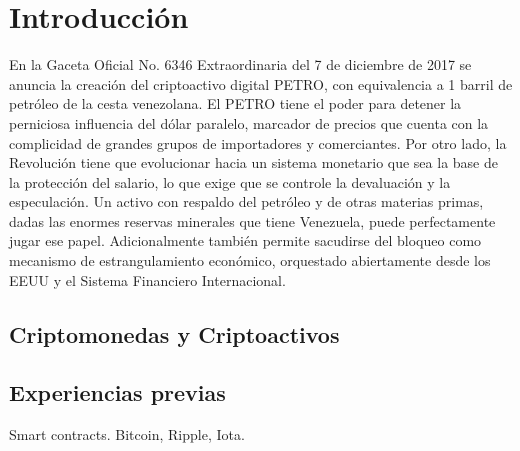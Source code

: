 %
\section{Introducción}
\label{sec:intro}
%
En la Gaceta Oficial No. 6346 Extraordinaria  del 7 de diciembre de 2017 se anuncia la creación del criptoactivo digital PETRO, con equivalencia a 1 barril de petróleo de la cesta venezolana. El PETRO tiene el poder para detener la perniciosa influencia del dólar paralelo, marcador de precios que cuenta con la complicidad de grandes grupos de importadores y comerciantes. Por otro lado, la Revolución tiene que evolucionar hacia un sistema monetario que sea la base de la protección del salario, lo que exige que se controle la devaluación y la especulación. Un activo con respaldo del petróleo y de otras materias primas, dadas las enormes reservas minerales que tiene Venezuela, puede perfectamente jugar ese papel.
Adicionalmente también permite sacudirse del bloqueo como mecanismo de estrangulamiento económico, orquestado abiertamente desde los EEUU y el Sistema Financiero Internacional.

\subsection{Criptomonedas y Criptoactivos}
\label{sec:cripto}

   
\subsection{Experiencias previas}
\label{sec:previous}

Smart contracts. Bitcoin, Ripple, Iota.

